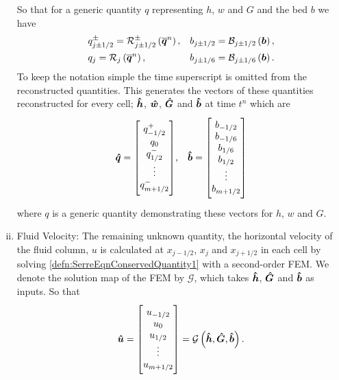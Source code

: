 \begin{enumerate}[(i)]
	So that for a generic quantity $q$ representing $h$, $w$ and $G$ and the bed $b$ we have
	\begin{align*}
	&q^\pm_{j\pm 1/2} = \mathcal{R}^\pm_{j \pm1/2} \left(\overline{\boldsymbol{q}}^n\right), &&b_{j\pm 1/2} = \mathcal{B}_{j\pm 1/2} \left(\boldsymbol{b}\right),  \\
	&q_{j} = \mathcal{R}_{j} \left(\overline{\boldsymbol{q}}^n\right), &&b_{j\pm 1/6} = \mathcal{B}_{j\pm 1/6}  \left(\boldsymbol{b}\right).
	\end{align*}
	To keep the notation simple the time superscript is omitted from the reconstructed quantities.	This generates the vectors of these quantities reconstructed for every cell; $\boldsymbol{\hat{h}}$, $\boldsymbol{\hat{w}}$, $\boldsymbol{\hat{G}}$ and $\boldsymbol{\hat{b}}$ at time $t^n$ which are
	\begin{align*}\vecn{\hat{q}} = \begin{bmatrix} \TM
	q^+_{-1/2} \\ q_0 \\ q^-_{1/2} \\ \vdots  \\ q^-_{m+1/2} \BM \end{bmatrix} & , & \vecn{\hat{b}} = \begin{bmatrix} \TM
	b_{-1/2} \\ b_{-1/6} \\ b_{1/6}  \\b_{1/2}  \\ \vdots \\ b_{m+1/2} \BM
	\end{bmatrix}
	\end{align*}
	where $q$ is a generic quantity demonstrating these vectors for $h$, $w$ and $G$.	
	\item Fluid Velocity: The remaining unknown quantity, the horizontal velocity of the fluid column, $u$ is calculated at $x_{j-1/2}$, $x_j$ and $x_{j+1/2}$ in each cell by solving \eqref{defn:SerreEqnConservedQuantity1} with a second-order FEM. We denote the solution map of the FEM by $\mathcal{G}$, which takes $\boldsymbol{\hat{h}}$, $\boldsymbol{\hat{G}}$ and $\boldsymbol{\hat{b}}$ as inputs. So that
	\begin{equation*}
	\vecn{\hat{u}} = 
	\begin{bmatrix} \TM	u_{-1/2} \\ u_0 \\ u_{1/2} \\ \vdots \\ u_{m+1/2} \BM
	\end{bmatrix} = \mathcal{G}\left( \vecn{\hat{h}}, \vecn{\hat{G}},\vecn{\hat{b}} \right).

\end{equation*}
\end{enumerate}
